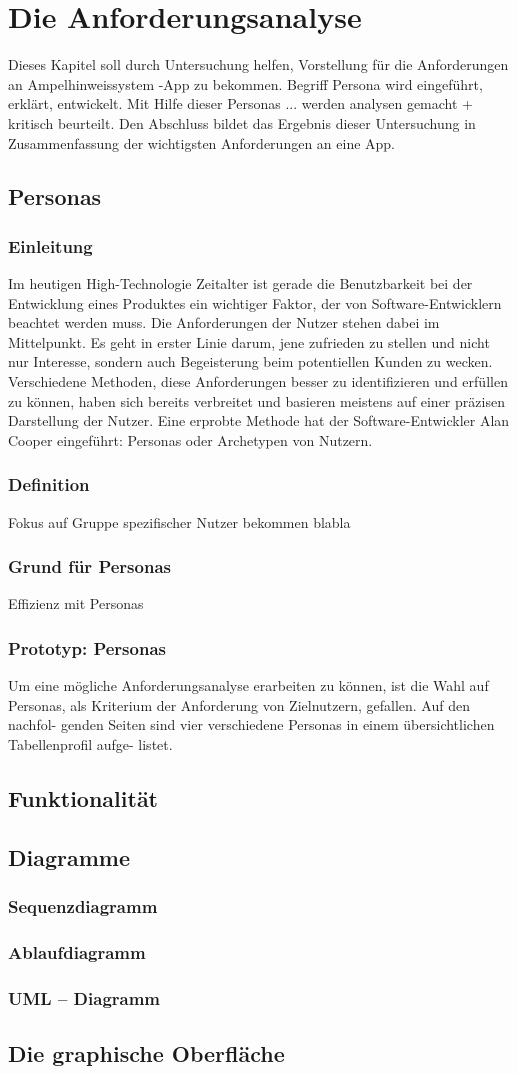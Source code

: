 \chapter{Die Anforderungsanalyse}
Dieses Kapitel soll durch Untersuchung helfen, Vorstellung für die Anforderungen an Ampelhinweissystem -App zu bekommen. Begriff Persona wird eingeführt, erklärt, entwickelt.
Mit Hilfe dieser Personas ... werden analysen gemacht + kritisch beurteilt.
Den Abschluss bildet das Ergebnis dieser Untersuchung in Zusammenfassung der wichtigsten Anforderungen an eine App.
\section{Personas}
\subsection{Einleitung}
Im heutigen High-Technologie Zeitalter ist gerade die Benutzbarkeit bei der Entwicklung eines Produktes ein wichtiger Faktor, der von Software-Entwicklern beachtet werden muss. Die Anforderungen der Nutzer stehen dabei im Mittelpunkt. Es geht in erster Linie darum, jene zufrieden zu stellen und nicht nur Interesse, sondern auch Begeisterung beim potentiellen Kunden zu wecken. Verschiedene Methoden, diese Anforderungen besser zu identifizieren und erfüllen zu können, haben sich bereits verbreitet und basieren meistens auf einer präzisen Darstellung der Nutzer. Eine erprobte Methode hat der Software-Entwickler Alan Cooper eingeführt: Personas oder Archetypen von Nutzern.
\subsection{Definition}
Fokus auf Gruppe spezifischer Nutzer bekommen blabla
\subsection{Grund für Personas}
Effizienz mit Personas
\subsection{Prototyp: Personas}
Um eine mögliche Anforderungsanalyse erarbeiten zu können, ist die
Wahl auf Personas, als Kriterium der Anforderung von Zielnutzern, gefallen. Auf den nachfol-
genden Seiten sind vier verschiedene Personas in einem übersichtlichen Tabellenprofil aufge-
listet.
\section{Funktionalität}
\section{Diagramme}
\subsection{Sequenzdiagramm}
\subsection{Ablaufdiagramm}
\subsection{UML -- Diagramm}
\section{Die graphische Oberfläche}
